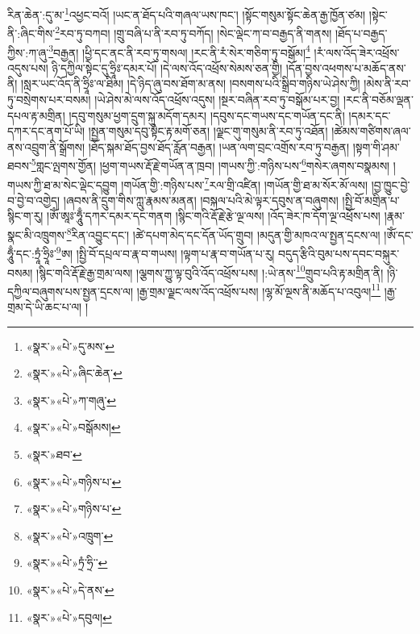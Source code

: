 རིན་ཆེན་:དུ་མ་\footnote{«སྣར་»«པེ་»དུ་མས་}འཕྱང་བའོ། །ཡང་ན་ཐོད་པའི་གཞལ་ཡས་ཁང་། །སྟོང་གསུམ་སྟོང་ཆེན་རྒྱ་ཁྱོན་ཙམ། །སྟེང་ནི་:ཞིང་གིས་\footnote{«སྣར་»«པེ་»ཞིང་ཆེན་}རབ་ཏུ་བཀབ། །གྲུ་བཞི་པ་ནི་རབ་ཏུ་བཀོད། །སེང་ལྡེང་ཀ་བ་བརྒྱད་ནི་གནས། །ཐོད་པ་བརྒྱད་ཀྱིས་:ཀ་ཞུ་\footnote{«སྣར་»«པེ་»ཀ་གཞུ་}བརྒྱན། །ཕྱི་དང་ནང་ནི་རབ་ཏུ་གསལ། །རང་ནི་རཾ་སེར་གཅིག་ཏུ་བསྒོམ།\footnote{«སྣར་»«པེ་»བསྒོམས།} །རཾ་ལས་འོད་ཟེར་འཕྲོས་འདུས་པས། ཉི་དཀྱིལ་སྟེང་དུ་ཧྲཱིཿ་དམར་པོ། །དེ་ལས་འོད་འཕྲོས་སེམས་ཅན་གྱི། །དོན་བྱས་འཕགས་པ་མཆོད་ནས་ནི། །སླར་ཡང་འོད་ནི་ཧྲཱིཿ་ལ་ཐིམ། །དེ་ཉིད་ཞུ་བས་ཐོག་མ་ནས། །བསགས་པའི་སྒྲིབ་གཉིས་ཡེ་ཤེས་ཀྱི། །མེས་ནི་རབ་ཏུ་བསྲེགས་པར་བསམ། །ཡེ་ཤེས་མེ་ལས་འོད་འཕྲོས་འདུས། །སྔར་བཞིན་རབ་ཏུ་བསྒོམ་པར་བྱ། །རང་ནི་བཅོམ་ལྡན་དཔལ་རྟ་མགྲིན། །དབུ་གསུམ་ཕྱག་དྲུག་སྐུ་མདོག་དམར། །དབུས་དང་གཡས་དང་གཡོན་དང་ནི། །དམར་དང་དཀར་དང་ནག་པོ་ཡི། །སྤྱན་གསུམ་དབུ་སྟེང་རྟ་མགོ་ཅན། །ལྗང་གུ་གསུམ་ནི་རབ་ཏུ་འཐོན། །ཚེམས་གཙིགས་ཞལ་ནས་འབྲུག་ནི་སྒྲོགས། །ཐོད་སྐམ་ཐོད་བྱས་ཐོད་རློན་བརྒྱན། །ཡན་ལག་བྲང་འགྲོས་རབ་ཏུ་བརྒྱན། །སྟག་གི་ཤམ་ཐབས་\footnote{«སྣར་»ཐབ་}གླང་ལྤགས་གྱོན། །ཕྱག་གཡས་རྡོ་རྗེ་གཡོན་ན་ཁྲབ། །གཡས་ཀྱི་:གཉིས་པས་\footnote{«སྣར་»«པེ་»གཉིས་པ་}གསེར་ཞགས་བསྣམས། །གཡས་ཀྱི་ཐ་མ་སེང་ལྡེང་དབྱུག །གཡོན་གྱི་:གཉིས་པས་\footnote{«སྣར་»«པེ་»གཉིས་པ་}རལ་གྲི་འཛིན། །གཡོན་གྱི་ཐ་མ་སོར་མོ་ལས། །བྱ་ཁྱུང་བྱེ་བ་བྱེ་བ་འགྱེད། །ཞབས་ནི་དྲུག་གིས་ཀླུ་རྣམས་མནན། །བསྐལ་པའི་མེ་ལྟར་དབུས་ན་བཞུགས། །སྤྱི་བོ་མགྲིན་པ་སྙིང་ག་རུ། །ཨོཾ་ཨཱཿ་ཧཱུྃ་དཀར་དམར་དང་གནག །སྙིང་གའི་རྡོ་རྗེ་རྩེ་ལྔ་ལས། །འོད་ཟེར་ཁ་དོག་ལྔ་འཕྲོས་པས། །རྣམ་སྣང་མི་འཁྲུགས་\footnote{«སྣར་»«པེ་»འཁྲུག་}རིན་འབྱུང་དང་། །ཚེ་དཔག་མེད་དང་དོན་ཡོད་གྲུབ། །མདུན་གྱི་མཁའ་ལ་སྤྱན་དྲངས་ལ། །ཨོཾ་དང་ཧཱུྃ་དང་:ཏྲཱཾ་ཧྲཱིཿ་\footnote{«སྣར་»«པེ་»ཏྲཾ་ཧྲི་་}ཨ། །སྤྱི་བོ་དཔྲལ་བ་རྣ་བ་གཡས། །ལྟག་པ་རྣ་བ་གཡོན་པ་རུ། བདུད་རྩིའི་བུམ་པས་དབང་བསྐུར་བསམ། །སྙིང་གའི་རྡོ་རྗེ་རྒྱ་གྲམ་ལས། །ལྕགས་ཀྱུ་ལྟ་བུའི་འོད་འཕྲོས་པས། །:ཡེ་ནས་\footnote{«སྣར་»«པེ་»དེ་ནས་}གྲུབ་པའི་རྟ་མགྲིན་ནི། །ཉི་དཀྱིལ་བཞུགས་པས་སྤྱན་དྲངས་ལ། །རྒྱ་གྲམ་ལྗང་ལས་འོད་འཕྲོས་པས། །ལྷ་མོ་ལྔས་ནི་མཆོད་པ་འབུལ།\footnote{«སྣར་»«པེ་»དབུལ།} །རྒྱ་གྲམ་དེ་ཡི་ཆང་པ་ལ། །
